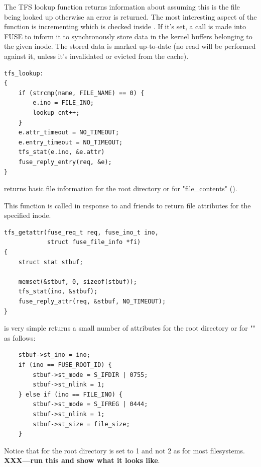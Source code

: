 \bigskip
\noindent
\textbf{}
\bigskip

\noindent
The TFS lookup function returns information about   assuming this is the file being looked up otherwise an error is returned. The most interesting aspect of the function is incrementing  which is checked inside . If it's set, a call is made into FUSE to inform it to synchronously store data in the kernel buffers belonging to the given inode. The stored data is marked up-to-date (no read will be performed against it, unless it's invalidated or evicted from the cache).

\begin{lstlisting}
tfs_lookup:
{
    if (strcmp(name, FILE_NAME) == 0) {
        e.ino = FILE_INO;
        lookup_cnt++;
    }
    e.attr_timeout = NO_TIMEOUT;
    e.entry_timeout = NO_TIMEOUT;
    tfs_stat(e.ino, &e.attr)                       
    fuse_reply_entry(req, &e);
}
\end{lstlisting}

\noindent
{} returns basic file information for the root directory or for "file\_contents" ().

\bigskip
\noindent
\textbf{}
\bigskip

\noindent
This function is called in response to  and friends to return file attributes for the specified inode. 

\begin{lstlisting}
tfs_getattr(fuse_req_t req, fuse_ino_t ino,
            struct fuse_file_info *fi) 
{
    struct stat stbuf;
            
    memset(&stbuf, 0, sizeof(stbuf));
    tfs_stat(ino, &stbuf);
    fuse_reply_attr(req, &stbuf, NO_TIMEOUT);
}
\end{lstlisting}

\noindent
{} is very simple returns a small number of attributes for the root directory or for "" as follows:

\begin{lstlisting}
    stbuf->st_ino = ino;
    if (ino == FUSE_ROOT_ID) {
        stbuf->st_mode = S_IFDIR | 0755;
        stbuf->st_nlink = 1;
    } else if (ino == FILE_INO) {
        stbuf->st_mode = S_IFREG | 0444;
        stbuf->st_nlink = 1;
        stbuf->st_size = file_size;
    }
\end{lstlisting}

\noindent
Notice that for the root directory  is set to 1 and not 2 as for most filesystems. \textbf{XXX---run this and show what it looks like}.

